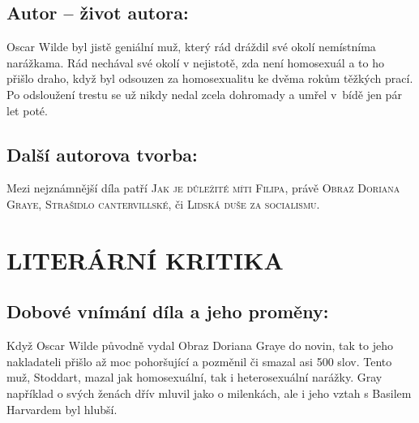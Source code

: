 \documentclass{extarticle} %
\begin{document}



\subsection*{Autor {\ssmall -- život autora:}}
\noindent 
Oscar Wilde byl jistě geniální muž, který rád dráždil své okolí nemístníma narážkama.
Rád nechával své okolí v nejistotě, zda není homosexuál a to ho přišlo draho, když byl odsouzen za homosexualitu ke dvěma rokům těžkých prací.
Po odsloužení trestu se už nikdy nedal zcela dohromady a umřel v~bídě jen pár let poté.


\subsection*{Další autorova tvorba:}
\noindent 
Mezi nejznámnější díla patří \textsc{Jak je důležité míti Filipa}, právě \textsc{Obraz Doriana Graye}, \textsc{Strašidlo cantervillské}, či \textsc{Lidská duše za socialismu}.


\section*{LITERÁRNÍ KRITIKA}

\subsection*{Dobové vnímání díla a jeho proměny:}
\noindent
Když Oscar Wilde původně vydal Obraz Doriana Graye do novin, tak to jeho nakladateli přišlo až moc pohoršující a pozměnil či smazal asi 500 slov.
Tento muž, Stoddart, mazal jak homosexuální, tak i heterosexuální narážky.
Gray například o svých ženách dřív mluvil jako o milenkách, ale i jeho vztah s Basilem Harvardem byl hlubší.
\end{document}
